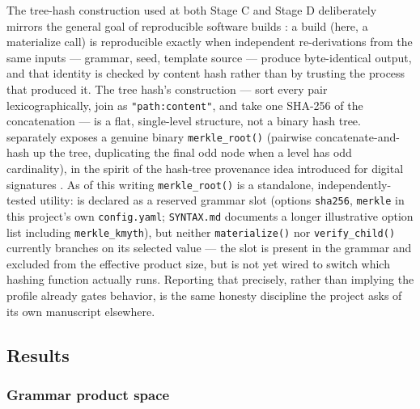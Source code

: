 \documentclass[
]{article}
\begin{document}
The tree-hash construction used at both Stage C and Stage D deliberately
mirrors the general goal of reproducible software builds
\citep{reproducible_builds}: a build (here, a materialize call) is
reproducible exactly when independent re-derivations from the same
inputs --- grammar, seed, template source --- produce byte-identical
output, and that identity is checked by content hash rather than by
trusting the process that produced it. The tree hash's construction ---
sort every  pair lexicographically, join as
\texttt{"path:content"}, and take one SHA-256 of the concatenation ---
is a flat, single-level structure, not a binary hash tree.
 separately exposes a genuine binary
\texttt{merkle\_root()} (pairwise concatenate-and-hash up the tree,
duplicating the final odd node when a level has odd cardinality), in the
spirit of the hash-tree provenance idea introduced for digital
signatures \citep{merkle_tree_provenance}. As of this writing
\texttt{merkle\_root()} is a standalone, independently-tested utility:
 is declared as a reserved grammar slot
(options \texttt{sha256}, \texttt{merkle} in this project's own
\texttt{config.yaml}; \texttt{SYNTAX.md} documents a longer illustrative
option list including \texttt{merkle\_kmyth}), but neither
\texttt{materialize()} nor \texttt{verify\_child()} currently branches
on its selected value --- the slot is present in the grammar and
excluded from the effective product size, but is not yet wired to switch
which hashing function actually runs. Reporting that precisely, rather
than implying the profile already gates behavior, is the same honesty
discipline the project asks of its own manuscript elsewhere.

\newpage

\subsection{Results}\label{results}

\subsubsection{Grammar product space}\label{grammar-product-space-1}
\end{document}
